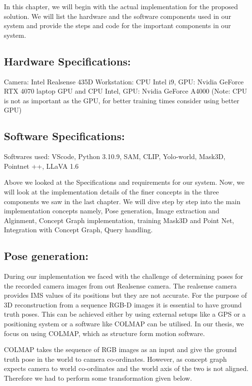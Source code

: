In this chapter, we will begin with the actual implementation for the proposed solution. 
We will list the hardware and the software components used in our system and provide the steps and code 
for the important components in our system.

\subsection{Hardware Specifications:}
Camera: Intel Realsense 435D
Workstation: CPU Intel i9, GPU: Nvidia GeForce RTX 4070 laptop GPU and CPU Intel, GPU: Nvidia GeForce A4000
(Note: CPU is not as important as the GPU, for better training times consider using better GPU)
\subsection{Software Specifications:}
Softwares used: VScode, Python 3.10.9, SAM, CLIP, Yolo-world, Mask3D, Pointnet ++, LLaVA 1.6

Above we looked at the Specifications and requirements for our system. Now, we will look at the implementation details of the finer concepts in the 
three components we saw in the last chapter.
We will dive step by step into the main implementation concepts namely, Pose generation, Image extraction and Alginment, Concept Graph implementation, 
training Mask3D and Point Net, Integration with Concept Graph, Query handling.

\subsection{Pose generation:}
During our implementation we faced with the challenge of determining poses for the recorded camera images from out Realsense camera. The realsense camera provides IMS 
values of its positions but they are not accurate. For the purpose of 3D reconstruction from a sequence RGB-D images it is essential to have ground truth poses. This 
can be achieved either by using external setups like a GPS or a positioning system or a software like COLMAP can be utilised. In our thesis, we focus on using COLMAP,
which as structure form motion software. 

COLMAP takes the sequence of RGB images as an input and give the ground truth pose in the world to camera co-ordinates. However, as concept graph expects camera to world
co-ordinates and the world axis of the two is not aligned. Therefore we had to perform some transformation given below.



